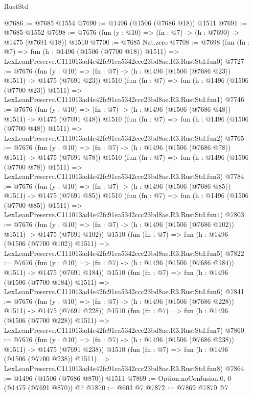 \begin{lexlean}{RustStd}
\begin{coremodule}
@7686 := @7685 @1554
@7690 := @1496 (@1506 (@7686 @18)) @1511
@7691 := @7685 @1552
@7698 := @7676 (fun (y : @10) => (fn : @7) -> (h : @7690) -> @1475 (@7691 @18)) @1510
@7700 := @7685 Nat.zero
@7708 := @7698
    (fun (fn : @7) =>
    fun (h : @1496 (@1506 (@7700 @18)) @1511) =>
    LexLeanPreserve.C111013ad4e42fc91ea5342ccc23bd8ae.R3.RustStd.fun0)
@7727 := @7676
    (fun (y : @10) => (fn : @7) -> (h : @1496 (@1506 (@7686 @23)) @1511) -> @1475 (@7691 @23))
    @1510
    (fun (fn : @7) =>
    fun (h : @1496 (@1506 (@7700 @23)) @1511) =>
    LexLeanPreserve.C111013ad4e42fc91ea5342ccc23bd8ae.R3.RustStd.fun1)
@7746 := @7676
    (fun (y : @10) => (fn : @7) -> (h : @1496 (@1506 (@7686 @48)) @1511) -> @1475 (@7691 @48))
    @1510
    (fun (fn : @7) =>
    fun (h : @1496 (@1506 (@7700 @48)) @1511) =>
    LexLeanPreserve.C111013ad4e42fc91ea5342ccc23bd8ae.R3.RustStd.fun2)
@7765 := @7676
    (fun (y : @10) => (fn : @7) -> (h : @1496 (@1506 (@7686 @78)) @1511) -> @1475 (@7691 @78))
    @1510
    (fun (fn : @7) =>
    fun (h : @1496 (@1506 (@7700 @78)) @1511) =>
    LexLeanPreserve.C111013ad4e42fc91ea5342ccc23bd8ae.R3.RustStd.fun3)
@7784 := @7676
    (fun (y : @10) => (fn : @7) -> (h : @1496 (@1506 (@7686 @85)) @1511) -> @1475 (@7691 @85))
    @1510
    (fun (fn : @7) =>
    fun (h : @1496 (@1506 (@7700 @85)) @1511) =>
    LexLeanPreserve.C111013ad4e42fc91ea5342ccc23bd8ae.R3.RustStd.fun4)
@7803 := @7676
    (fun (y : @10) => (fn : @7) -> (h : @1496 (@1506 (@7686 @102)) @1511) -> @1475 (@7691 @102))
    @1510
    (fun (fn : @7) =>
    fun (h : @1496 (@1506 (@7700 @102)) @1511) =>
    LexLeanPreserve.C111013ad4e42fc91ea5342ccc23bd8ae.R3.RustStd.fun5)
@7822 := @7676
    (fun (y : @10) => (fn : @7) -> (h : @1496 (@1506 (@7686 @184)) @1511) -> @1475 (@7691 @184))
    @1510
    (fun (fn : @7) =>
    fun (h : @1496 (@1506 (@7700 @184)) @1511) =>
    LexLeanPreserve.C111013ad4e42fc91ea5342ccc23bd8ae.R3.RustStd.fun6)
@7841 := @7676
    (fun (y : @10) => (fn : @7) -> (h : @1496 (@1506 (@7686 @228)) @1511) -> @1475 (@7691 @228))
    @1510
    (fun (fn : @7) =>
    fun (h : @1496 (@1506 (@7700 @228)) @1511) =>
    LexLeanPreserve.C111013ad4e42fc91ea5342ccc23bd8ae.R3.RustStd.fun7)
@7860 := @7676
    (fun (y : @10) => (fn : @7) -> (h : @1496 (@1506 (@7686 @238)) @1511) -> @1475 (@7691 @238))
    @1510
    (fun (fn : @7) =>
    fun (h : @1496 (@1506 (@7700 @238)) @1511) =>
    LexLeanPreserve.C111013ad4e42fc91ea5342ccc23bd8ae.R3.RustStd.fun8)
@7864 := @1496 (@1506 (@7686 @870)) @1511
@7869 := Option.noConfusion.{0, 0} (@1475 (@7691 @870)) @7
@7870 := @603 @7
@7872 := @7869 @7870 @7

\end{coremodule}
\end{lexlean}
